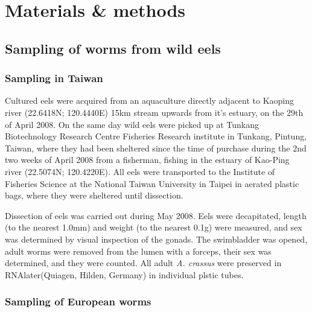 

\chapter{Materials \& methods} %



\ifpdf
    \graphicspath{{8/figures/PNG/}{8/figures/PDF/}{8/figures/}}
\else
    \graphicspath{{8/figures/EPS/}{8/figures/}}
\fi



\section{Sampling of worms from  wild eels}

\subsection{Sampling in Taiwan}

Cultured eels were acquired from an aquaculture directly adjacent to
Kaoping river (22.6418N; 120.4440E) 15km stream upwards from it's
estuary, on the 29th of April 2008. On the same day wild eels were
picked up at Tunkang Biotechnology Research Centre Fisheries Research
institute in Tunkang, Pintung, Taiwan, where they had been sheltered
since the time of purchase during the 2nd two weeks of April 2008 from
a fisherman, fishing in the estuary of Kao-Ping river (22.5074N;
120.4220E). All eels were transported to the Institute of Fisheries
Science at the National Taiwan University in Taipei in aerated plastic
bags, where they were sheltered until dissection.

Dissection of eels was carried out during May 2008. Eels were
decapitated, length (to the nearest 1.0mm) and weight (to the nearest
0.1g) were measured, and sex was determined by visual inspection of
the gonads. The swimbladder was opened, adult worms were removed from
the lumen with a forceps, their sex was determined, and they were
counted. All adult \textit{A. crassus} were preserved in
RNAlater(Quiagen, Hilden, Germany) in individual plstic tubes.

\subsection{Sampling of European worms}

